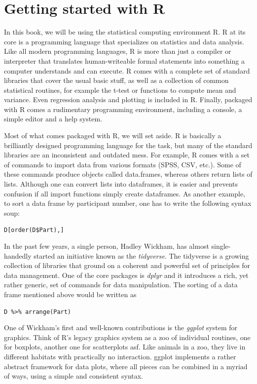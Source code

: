 \documentclass[]{svmono}
\begin{document}
\chapter{Getting started with R}\label{getting_started_r}

In this book, we will be using the statistical computing environment R.
R at its core is a programming language that specializes on statistics
and data analysis. Like all modern programming languages, R is more than
just a compiler or interpreter that translates human-writeable formal
statements into something a computer understands and can execute. R
comes with a complete set of standard libraries that cover the usual
basic stuff, as well as a collection of common statistical routines, for
example the t-test or functions to compute mean and variance. Even
regression analysis and plotting is included in R. Finally, packaged
with R comes a rudimentary programming environment, including a console,
a simple editor and a help system.

Most of what comes packaged with R, we will set aside. R is basically a
brilliantly designed programming language for the task, but many of the
standard libraries are an inconsistent and outdated mess. For example, R
comes with a set of commands to import data from various formats (SPSS,
CSV, etc.). Some of these commands produce objects called data.frames,
whereas others return lists of lists. Although one can convert lists
into dataframes, it is easier and prevents confusion if all import
functions simply create dataframes. As another example, to sort a data
frame by participant number, one has to write the following syntax soup:

\texttt{D{[}order(D\$Part),{]}}

In the past few years, a single person, Hadley Wickham, has almost
single-handedly started an initiative known as the \emph{tidyverse}. The
tidyverse is a growing collection of libraries that ground on a coherent
and powerful set of principles for data management. One of the core
packages is \emph{dplyr} and it introduces a rich, yet rather generic,
set of commands for data manipulation. The sorting of a data frame
mentioned above would be written as

\texttt{D\ \%\textgreater{}\%\ arrange(Part)}

One of Wickham's first and well-known contributions is the \emph{ggplot}
system for graphics. Think of R's legacy graphics system as a zoo of
individual routines, one for boxplots, another one for scatterplots asf.
Like animals in a zoo, they live in different habitats with practically
no interaction. ggplot implements a rather abstract framework for data
plots, where all pieces can be combined in a myriad of ways, using a
simple and consistent syntax.
\end{document}
